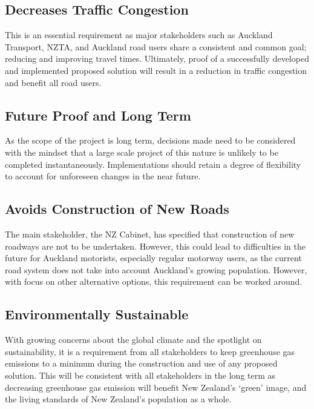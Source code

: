 \documentclass[twoside, a4paper, 11pt]{article}
\begin{document}
\subsection{Decreases Traffic Congestion}
This is an essential requirement as major stakeholders such as Auckland Transport, NZTA, and Auckland road users share a consistent and common goal; reducing and improving travel times. Ultimately, proof of a successfully developed and implemented proposed solution will result in a reduction in traffic congestion and benefit all road users.


\subsection{Future Proof and Long Term}
As the scope of the project is long term, decisions made need to be considered with the mindset that a large scale project of this nature is unlikely to be completed instantaneously. Implementations should retain a degree of flexibility to account for unforeseen changes in the near future.

\subsection{Avoids Construction of New Roads}
The main stakeholder, the NZ Cabinet, has specified that construction of new roadways are not to be undertaken. However, this could lead to difficulties in the future for Auckland motorists, especially regular motorway users, as the current road system does not take into account Auckland's growing population\citep{herald17}. However, with focus on other alternative options, this requirement can be worked around.

\subsection{Environmentally Sustainable}
With growing concerns about the global climate and the spotlight on sustainability, it is a requirement from all stakeholders to keep greenhouse gas emissions to a minimum during the construction and use of any proposed solution. This will be consistent with all stakeholders in the long term as decreasing greenhouse gas emission will benefit New Zealand's `green' image, and the living standards of New Zealand's population as a whole.
\end{document}
